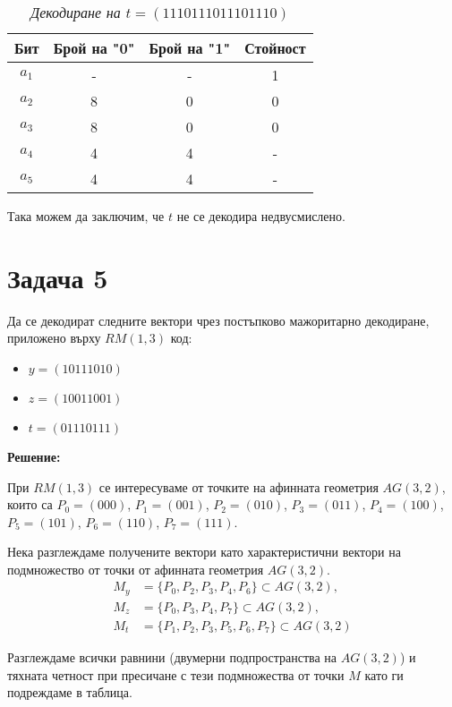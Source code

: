 \documentclass[11pt, oneside]{article}   	%
\begin{document}
\begin{table}[htbp]
    \centering
    \begin{tabular}{cccc}
        \toprule
            \textbf{Бит} & \textbf{Брой на "0"} & \textbf{Брой на "1"} & \textbf{Стойност} \\
        \midrule
            $ a_1 $ & - & - & 1 \\
            $ a_2 $ & 8 & 0 & 0 \\
            $ a_3 $ & 8 & 0 & 0 \\
            $ a_4 $ & 4 & 4 & - \\
            $ a_5 $ & 4 & 4 & - \\
        \bottomrule
    \end{tabular}
    \caption{\textit{Декодиране на $t = (1110 1110 1110 1110)$}}
\end{table}

Така можем да заключим, че $t$ не се декодира недвусмислено.

\section*{Задача 5}
Да се декодират следните вектори чрез постъпково мажоритарно декодиране, приложено върху $RM(1, 3)$ код:
\begin{itemize}
  \item $y = (10111010)$
  \item $z = (10011001)$
  \item $t = (01110111)$
\end{itemize}

\textbf{Решение:}

При $RM(1, 3)$ се интересуваме от точките на афинната геометрия $AG(3, 2)$, които са
$P_0 = (000)$, $P_1 = (001)$, $P_2 = (010)$, $P_3 = (011)$, $P_4 = (100)$, $P_5 = (101)$, $P_6 = (110)$, $P_7 = (111)$.

Нека разглеждаме получените вектори като характеристични вектори на подмножество от точки от афинната геометрия $AG(3, 2)$.
\begin{align*}
M_{y} &= \{P_0,P_2,P_3,P_4,P_6\} \subset AG(3, 2), \\
M_{z} &= \{P_0,P_3,P_4,P_7\} \subset AG(3, 2), \\ 
M_{t} &= \{P_1,P_2,P_3,P_5,P_6,P_7\} \subset AG(3, 2)
\end{align*}

Разглеждаме всички равнини (двумерни подпространства на $AG(3, 2)$) и тяхната четност при пресичане с тези подмножества от точки $M$ като ги подреждаме в таблица.
\end{document}
